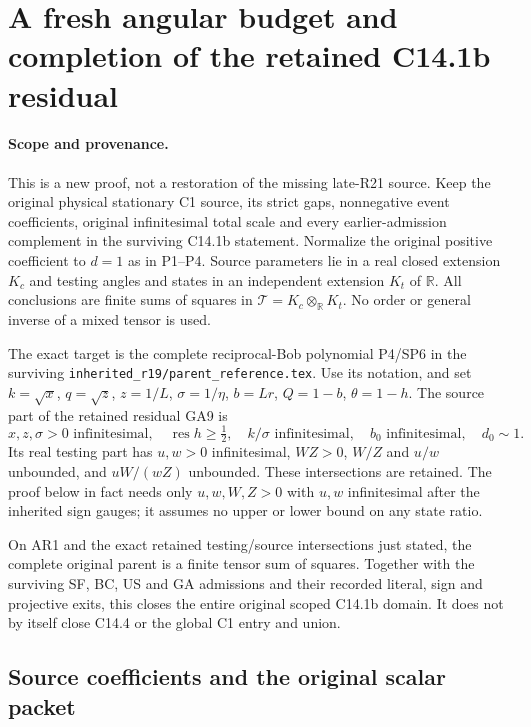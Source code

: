 \section{A fresh angular budget and completion of the retained C14.1b residual}
\label{sec:c141b-residual-rederived}

\paragraph{Scope and provenance.}
This is a new proof, not a restoration of the missing late-R21 source.
Keep the original physical stationary C1 source, its strict gaps,
nonnegative event coefficients, original infinitesimal total scale and
every earlier-admission complement in the surviving C14.1b statement.
Normalize the original positive coefficient to $d=1$ as in P1--P4.
Source parameters lie in a real closed extension $K_c$ and testing
angles and states in an independent extension $K_t$ of $\mathbb R$.
All conclusions are finite sums of squares in
$\mathcal T=K_c\otimes_{\mathbb R}K_t$. No order or general inverse
of a mixed tensor is used.

The exact target is the complete reciprocal-Bob polynomial P4/SP6
in the surviving \texttt{inherited\_r19/parent\_reference.tex}.
Use its notation, and set $k=\sqrt x$, $q=\sqrt z$, $z=1/L$,
$\sigma=1/\eta$, $b=Lr$, $Q=1-b$, $\theta=1-h$.
The source part of the retained residual GA9 is
\[
 x,z,\sigma>0\text{ infinitesimal},\quad
 \operatorname{res}h\ge\tfrac12,\quad k/\sigma\text{ infinitesimal},
 \quad b_0\text{ infinitesimal},\quad d_0\sim1.
 \tag{AR1}
\]
Its real testing part has $u,w>0$ infinitesimal, $WZ>0$,
$W/Z$ and $u/w$ unbounded, and $uW/(wZ)$ unbounded. These
intersections are retained. The proof below in fact needs only
$u,w,W,Z>0$ with $u,w$ infinitesimal after the inherited sign
gauges; it assumes no upper or lower bound on any state ratio.

\begin{theorem}
On AR1 and the exact retained testing/source intersections just
stated, the complete original parent is a finite tensor sum of
squares. Together with the surviving SF, BC, US and GA admissions
and their recorded literal, sign and projective exits, this closes
the entire original scoped C14.1b domain. It does not by itself
close C14.4 or the global C1 entry and union.
\end{theorem}

\subsection{Source coefficients and the original scalar packet}

